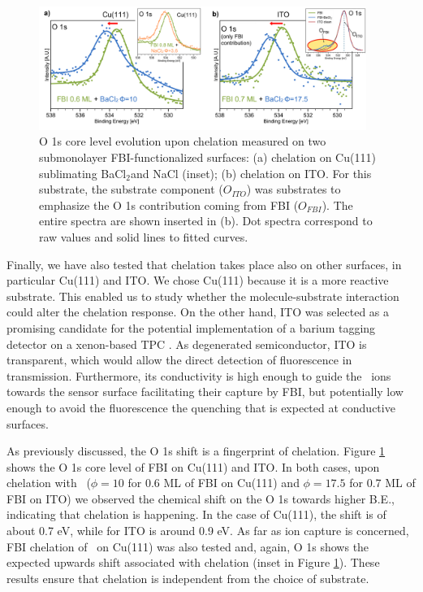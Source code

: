 \documentclass[aps,prl,reprint,longbibliography,superscriptaddress, english]{revtex4-1}
\def\BappCl{BaCl$_2$}
\begin{document}
\begin{figure}[ht!]
	\includegraphics[width=0.95\textwidth]{figures/Figure_5.png}
	\caption{\label{XPS_FBI_Cu_ITO} 
    O 1s core level evolution upon chelation measured on two submonolayer FBI-functionalized surfaces: (a) chelation on Cu(111) sublimating \BappCl and NaCl (inset); (b) chelation on ITO. For this substrate, the substrate component (${O_{ITO}}$) was substrates to emphasize the O 1s contribution coming from FBI (${O_{FBI}}$). The entire spectra are shown inserted in (b). Dot spectra correspond to raw values and solid lines to fitted curves.}
\end{figure} 

Finally, we have also tested that chelation takes place also on other surfaces, in particular Cu(111) and ITO. We chose Cu(111) because it is a more reactive substrate. This enabled us to study whether the molecule-substrate interaction could alter the chelation response. On the other hand, ITO was selected as a promising candidate for the potential implementation of a barium tagging detector on a xenon-based TPC \cite{rivilla_fluorescent_2020}. As degenerated semiconductor, ITO is transparent, which would allow the direct detection of fluorescence in transmission. Furthermore, its conductivity is high enough to guide the \Bapp\ ions towards the sensor surface facilitating their capture by FBI, but potentially low enough to avoid the fluorescence the quenching that is expected at conductive surfaces.

As previously discussed, the O 1s shift is a fingerprint of chelation. Figure \ref{XPS_FBI_Cu_ITO} shows the O 1s core level of FBI on Cu(111) and ITO. In both cases, upon chelation with \Bapp\ ($\phi = 10$ for 0.6 ML of FBI on Cu(111) and $\phi = 17.5$ for 0.7 ML of FBI on ITO) we observed the chemical shift on the O 1s towards higher B.E., indicating that chelation is happening. In the case of Cu(111), the shift is of about 0.7 eV, while for ITO is around 0.9 eV. As far as ion capture is concerned, FBI chelation of \Nap\  on Cu(111) was also tested and, again, O 1s shows the expected upwards shift associated with chelation (inset in Figure \ref{XPS_FBI_Cu_ITO}). These results ensure that chelation is independent from the choice of substrate.
\end{document}
